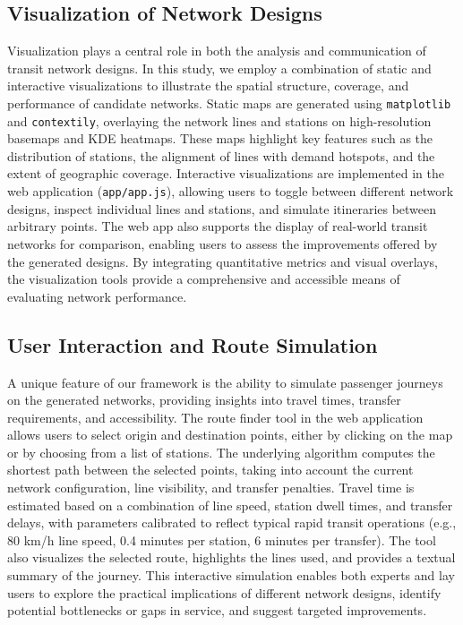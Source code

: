 \documentclass[manuscript,screen,review]{acmart}
\begin{document}
\subsection{Visualization of Network Designs}
Visualization plays a central role in both the analysis and communication of transit network designs. In this study, we employ a combination of static and interactive visualizations to illustrate the spatial structure, coverage, and performance of candidate networks. Static maps are generated using \texttt{matplotlib} and \texttt{contextily}, overlaying the network lines and stations on high-resolution basemaps and KDE heatmaps. These maps highlight key features such as the distribution of stations, the alignment of lines with demand hotspots, and the extent of geographic coverage. Interactive visualizations are implemented in the web application (\texttt{app/app.js}), allowing users to toggle between different network designs, inspect individual lines and stations, and simulate itineraries between arbitrary points. The web app also supports the display of real-world transit networks for comparison, enabling users to assess the improvements offered by the generated designs. By integrating quantitative metrics and visual overlays, the visualization tools provide a comprehensive and accessible means of evaluating network performance.

\subsection{User Interaction and Route Simulation}
A unique feature of our framework is the ability to simulate passenger journeys on the generated networks, providing insights into travel times, transfer requirements, and accessibility. The route finder tool in the web application allows users to select origin and destination points, either by clicking on the map or by choosing from a list of stations. The underlying algorithm computes the shortest path between the selected points, taking into account the current network configuration, line visibility, and transfer penalties. Travel time is estimated based on a combination of line speed, station dwell times, and transfer delays, with parameters calibrated to reflect typical rapid transit operations (e.g., 80 km/h line speed, 0.4 minutes per station, 6 minutes per transfer). The tool also visualizes the selected route, highlights the lines used, and provides a textual summary of the journey. This interactive simulation enables both experts and lay users to explore the practical implications of different network designs, identify potential bottlenecks or gaps in service, and suggest targeted improvements.
\end{document}
